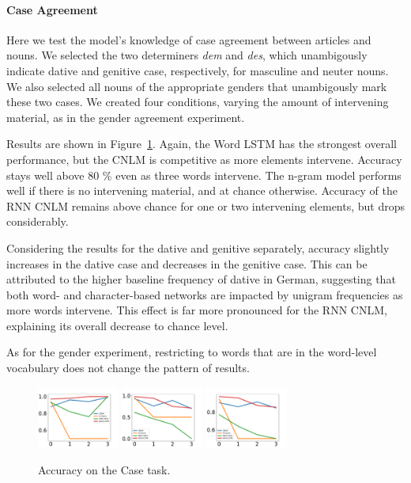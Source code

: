 \paragraph{Case Agreement}
Here we test the model's knowledge of case agreement between articles and nouns.
We selected the two determiners \emph{dem} and \emph{des}, which unambigously indicate dative and genitive case, respectively, for masculine and neuter nouns.
We also selected all nouns of the appropriate genders that unambigously mark these two cases.
We created four conditions, varying the amount of intervening material, as in the gender agreement experiment.

Results are shown in Figure~\ref{fig:case}.
Again, the Word LSTM has the strongest overall performance, but the CNLM is competitive as more elements intervene. Accuracy stays well above 80 \% even as three words intervene.
The n-gram model performs well if there is no intervening material, and at chance otherwise.
Accuracy of the RNN CNLM remains above chance for one or two intervening elements, but drops considerably.

Considering the results for the dative and genitive separately, accuracy slightly increases in the dative case and decreases in the genitive case.
This can be attributed to the higher baseline frequency of dative in German, suggesting that both word- and character-based networks are impacted by unigram frequencies as more words intervene.
This effect is far more pronounced for the RNN CNLM, explaining its overall decrease to chance level.

As for the gender experiment, restricting to words that are in the word-level vocabulary does not change the pattern of results.
\begin{figure}
\includegraphics[width=0.24\textwidth]{figures/german-case-Dative.pdf}
\includegraphics[width=0.24\textwidth]{figures/german-case-Genitive.pdf}
\includegraphics[width=0.24\textwidth]{figures/german-case-total.pdf}
\caption{Accuracy on the Case task.}\label{fig:case}
\end{figure}

